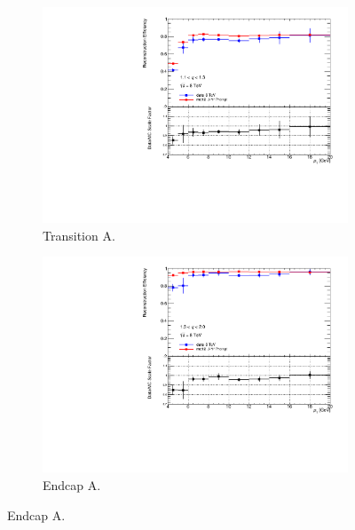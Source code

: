 \begin{figure}[htbp]
  \begin{subfigure}[b]{0.45\textwidth}
    \includegraphics[width=\textwidth]{PartCalibration2012/Plots/SFPlots/Transition_A_reco.pdf}
    \caption{Transition A.} \label{fig:CalibrationRecoSFTransitionA}
  \end{subfigure}
  \hfill
  \begin{subfigure}[b]{0.45\textwidth}
    \includegraphics[width=\textwidth]{PartCalibration2012/Plots/SFPlots/Endcap_A_reco.pdf}
    \caption{Endcap A.} \label{fig:CalibrationRecoSFEndcapA}
  \end{subfigure}


\end{figure}
